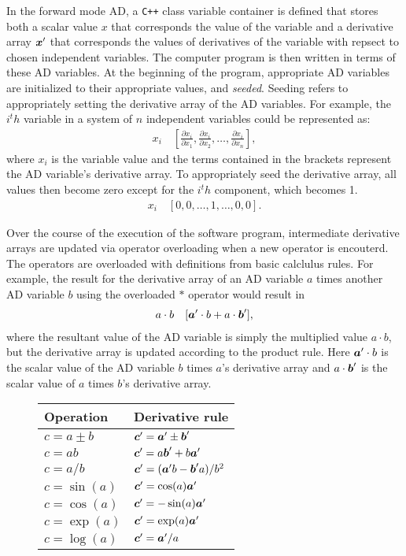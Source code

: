 In the forward mode AD, a \texttt{C++} class variable container is defined
that stores both a scalar value $x$ that corresponds the value of the variable
and a derivative array $\boldsymbol{x}'$ that corresponds the values of derivatives of
the variable with repsect to chosen independent variables. The computer
program is then written in terms of these AD variables. At the beginning of
the program, appropriate AD variables are initialized to their appropriate
values, and \emph{seeded}. Seeding refers to appropriately setting the
derivative array of the AD variables. For example, the $i^th$ variable in a
system of $n$ independent variables could be represented as:
%
\begin{gather}
x_i \quad
[ \frac{\partial x_i}{\partial x_1},
\frac{\partial x_i}{\partial x_2},
\dots, \frac{\partial x_i}{\partial x_n} ],
\end{gather}
%
where $x_i$ is the variable value and the terms contained in the brackets
represent the AD variable's derivative array. To appropriately seed the
derivative array, all values then become zero except for the $i^th$ component,
which becomes 1.
%
\begin{gather}
x_i \quad [0, 0, \dots, 1, \dots, 0, 0].
\end{gather}

Over the course of the execution of the software program, intermediate
derivative arrays are updated via operator overloading when a new operator is
encouterd. The operators are overloaded with definitions from basic calclulus
rules. For example, the result for the derivative array of an AD variable $a$
times another AD variable $b$ using the overloaded $*$ operator would result
in
%
\begin{gather}
a \cdot b \quad [ \boldsymbol{a}' \cdot  b + a \cdot \boldsymbol{b}' ],
\end{gather}
%
where the resultant value of the AD variable is simply the multiplied value
$a \cdot b$, but the derivative array is updated according to the product rule.
Here $\boldsymbol{a}' \cdot b$ is the scalar value of the AD variable $b$ times $a$'s
derivative array and $a \cdot \boldsymbol{b}'$ is the scalar value of $a$ times
$b$'s derivative array.

\begin{figure}
\centering
\begin{tabular}{|  l | l |}
\hline
Operation & Derivative rule \\ \hline
$c = a \pm b$ & $\boldsymbol{c}' = \boldsymbol{a}' \pm \boldsymbol{b}'$ \\ \hline
$c = ab$      & $\boldsymbol{c}' = a \boldsymbol{b}' + b \boldsymbol{a}'$ \\ \hline
$c = a/b$     & $\boldsymbol{c}' = (\boldsymbol{a}' b - \boldsymbol{b}' a) / b^2$ \\ \hline
$c = \sin(a)$  & $\boldsymbol{c}' = \cos(a) \boldsymbol{a}'$ \\ \hline
$c = \cos(a)$  & $\boldsymbol{c}' = -\sin(a) \boldsymbol{a}'$ \\ \hline
$c = \exp(a)$  & $\boldsymbol{c}' = \exp(a) \boldsymbol{a}'$ \\ \hline
$c = \log(a)$  & $\boldsymbol{c}' = \boldsymbol{a}'/a $ \\ \hline
\end{tabular}
\end{figure}

